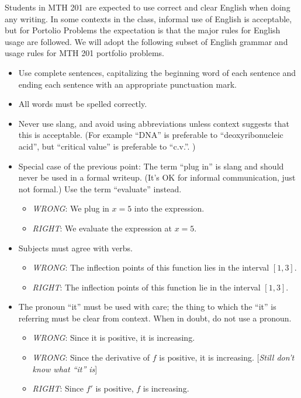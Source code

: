 \documentclass[11pt]{article}
\begin{document}
Students in MTH 201 are expected to use correct and clear English when doing any writing. In some contexts in the class, informal use of English is acceptable, but for Portolio Problems the expectation is that the major rules for English usage are followed. We will adopt the following subset of English grammar and usage rules for MTH 201 portfolio problems. 

\begin{itemize}
	\item Use complete sentences, capitalizing the beginning word of each sentence and ending each sentence with an appropriate punctuation mark. 
	\item All words must be spelled correctly. 
	\item Never use slang, and avoid using abbreviations unless context suggests that this is acceptable. (For example ``DNA'' is preferable to ``deoxyribonucleic acid'', but ``critical value'' is preferable to ``c.v.''. )
	\item Special case of the previous point: The term ``plug in'' is slang and should never be used in a formal writeup. (It's OK for informal communication, just not formal.) Use the term ``evaluate'' instead. 
		\begin{itemize}
			\item \emph{WRONG}: We plug in $x = 5$ into the expression. 
			\item \emph{RIGHT}: We evaluate the expression at $x=5$. 
		\end{itemize}
	
	
	\item Subjects must agree with verbs. 
	\begin{itemize}
		\item \emph{WRONG}: The inflection points of this function lies in the interval $[1,3]$. 
		\item \emph{RIGHT}: The inflection points of this function lie in the interval $[1,3]$. 
	\end{itemize}
	
	\item The pronoun ``it'' must be used with care; the thing to which the ``it'' is referring must be clear from context. When in doubt, do not use a pronoun. 
	\begin{itemize}
		\item \emph{WRONG}: Since it is positive, it is increasing. 
		\item \emph{WRONG}: Since the derivative of $f$ is positive, it is increasing. [\emph{Still don't know what ``it'' is}]
		\item \emph{RIGHT}: Since $f'$ is positive, $f$ is increasing. 
	\end{itemize}
	

\end{itemize}
\end{document}
